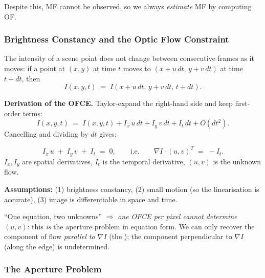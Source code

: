 Despite this, MF cannot be observed, so we always \emph{estimate} MF by computing OF.

\bigseparator

\subsubsection{Brightness Constancy and the Optic Flow Constraint}

\begin{defbox}
The intensity of a scene point does not change between consecutive frames as it moves: if a point at $(x,y)$ at time $t$ moves to $(x+u\,dt,\,y+v\,dt)$ at time $t+dt$, then
\[
I(x,y,t) \;=\; I(x + u\,dt,\, y + v\,dt,\, t + dt).
\]
\end{defbox}

\textbf{Derivation of the OFCE.} Taylor-expand the right-hand side and keep first-order terms:
\[
I(x,y,t) \;=\; I(x,y,t) + I_x\, u\,dt + I_y\, v\,dt + I_t\,dt + O(dt^2).
\]
Cancelling and dividing by $dt$ gives:

\begin{thmbox}
\[
I_x\, u \;+\; I_y\, v \;+\; I_t \;=\; 0,
\qquad \text{i.e.}\qquad \nabla I \cdot (u,v)^T \;=\; -I_t.
\]
$I_x, I_y$ are spatial derivatives, $I_t$ is the temporal derivative, $(u,v)$ is the unknown flow.
\end{thmbox}

\textbf{Assumptions:} (1) brightness constancy, (2) small motion (so the linearisation is accurate), (3) image is differentiable in space and time.

\begin{tipbox}
``One equation, two unknowns'' $\Rightarrow$ \emph{one OFCE per pixel cannot determine $(u,v)$}: this \emph{is} the aperture problem in equation form. We can only recover the component of flow \emph{parallel to $\nabla I$} (the ); the component perpendicular to $\nabla I$ (along the edge) is undetermined.
\end{tipbox}

\bigseparator

\subsubsection{The Aperture Problem}

